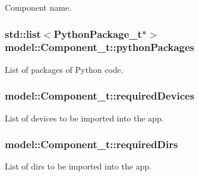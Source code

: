 Component name. 

\subsubsection[{\texorpdfstring{python\+Packages}{pythonPackages}}]{\setlength{\rightskip}{0pt plus 5cm}std\+::list$<${\bf Python\+Package\+\_\+t}$\ast$$>$ model\+::\+Component\+\_\+t\+::python\+Packages}\hypertarget{structmodel_1_1_component__t_a826d9dfd0bd18fb0e016db82d3314b2a}{}\label{structmodel_1_1_component__t_a826d9dfd0bd18fb0e016db82d3314b2a}


List of packages of Python code. 

\subsubsection[{\texorpdfstring{required\+Devices}{requiredDevices}}]{ model\+::\+Component\+\_\+t\+::required\+Devices}\hypertarget{structmodel_1_1_component__t_aa139617cacf2bdf7402f05c50a935124}{}\label{structmodel_1_1_component__t_aa139617cacf2bdf7402f05c50a935124}


List of devices to be imported into the app. 

\subsubsection[{\texorpdfstring{required\+Dirs}{requiredDirs}}]{ model\+::\+Component\+\_\+t\+::required\+Dirs}\hypertarget{structmodel_1_1_component__t_a4325259f17dd85ae9870769a374ccdb3}{}\label{structmodel_1_1_component__t_a4325259f17dd85ae9870769a374ccdb3}


List of dirs to be imported into the app. 


